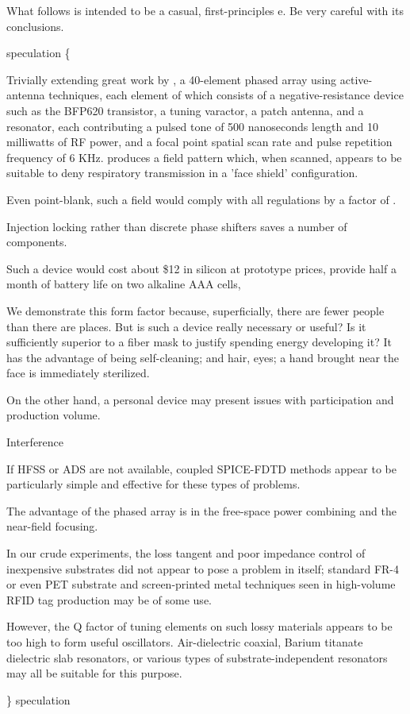 \documentclass[paper.tex]{subfiles}
\begin{document}
\begin{autem}
What follows is intended to be a casual, first-principles e. Be very careful with its conclusions.
\end{autem}

{\color{red} speculation \{ } 

Trivially extending great work by \cite{Focusing}, a 40-element phased array using active-antenna techniques, each element of which consists of a negative-resistance device such as the BFP620 transistor, a tuning varactor, a patch antenna, and a resonator, each contributing a pulsed tone of 500 nanoseconds length and 10 milliwatts of RF power, and a focal point spatial scan rate and pulse repetition frequency of 6 KHz. produces a field pattern which, when scanned, appears to be suitable to deny respiratory transmission in a 'face shield' configuration. 

Even point-blank, such a field would comply with all regulations by a factor of .

Injection locking rather than discrete phase shifters saves a number of components.

Such a device would cost about \$12 in silicon at prototype prices, provide half a month of battery life on two alkaline AAA cells, 

We demonstrate this form factor because, superficially, there are fewer people than there are places. But is such a device really necessary or useful? Is it sufficiently superior to a fiber mask to justify spending energy developing it? It has the advantage of being self-cleaning; and hair, eyes; a hand brought near the face is immediately sterilized.



On the other hand, a personal device may present issues with participation and production volume. 

Interference

If HFSS or ADS are not available, coupled SPICE-FDTD methods appear to be particularly simple and effective for these types of problems.

The advantage of the phased array is in the free-space power combining and the near-field focusing.

In our crude experiments, the loss tangent and poor impedance control of inexpensive substrates did not appear to pose a problem in itself; standard FR-4 or even PET substrate and screen-printed metal techniques seen in high-volume RFID tag production may be of some use. 

However, the Q factor of tuning elements on such lossy materials appears to be too high to form useful oscillators. Air-dielectric coaxial, Barium titanate dielectric slab resonators, or various types of substrate-independent resonators may all be suitable for this purpose.

{\color{red} \} speculation } 
\end{document}
